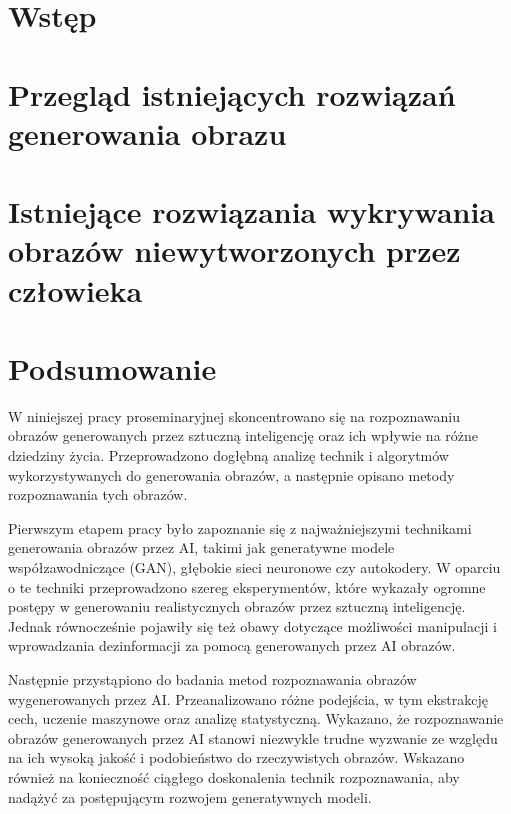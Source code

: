 \documentclass[11pt,a4paper,twoside,openright]{bookest}
\author{Patryk Lisik}
\begin{document}
    
    \delimitershortfall=-1pt

    \tableofcontents



    \chapter{Wstęp}\label{ch:wstep}
    

    \chapter{Przegląd istniejących rozwiązań generowania obrazu}\label{ch:przeglad-istniejacych-rozwiazan-generowania-obrazu}
    

    \chapter{Istniejące rozwiązania wykrywania obrazów niewytworzonych przez człowieka}\label{ch:istniejace-rozwiazania-wykrywania-obrazow-niewytworzonych-przez-czowieka}
    

    \chapter{Podsumowanie}\label{ch:podsumowanie}

    W niniejszej pracy proseminaryjnej skoncentrowano się na rozpoznawaniu obrazów generowanych przez sztuczną inteligencję oraz ich wpływie na różne dziedziny życia.
    Przeprowadzono dogłębną analizę technik i algorytmów wykorzystywanych do generowania obrazów, a następnie opisano metody rozpoznawania tych obrazów.

    Pierwszym etapem pracy było zapoznanie się z najważniejszymi technikami generowania obrazów przez AI, takimi jak generatywne modele współzawodniczące (GAN), głębokie sieci neuronowe czy autokodery.
    W oparciu o te techniki przeprowadzono szereg eksperymentów, które wykazały ogromne postępy w generowaniu realistycznych obrazów przez sztuczną inteligencję.
    Jednak równocześnie pojawiły się też obawy dotyczące możliwości manipulacji i wprowadzania dezinformacji za pomocą generowanych przez AI obrazów.

    Następnie przystąpiono do badania metod rozpoznawania obrazów wygenerowanych przez AI. Przeanalizowano różne podejścia, w tym ekstrakcję cech, uczenie maszynowe oraz analizę statystyczną.
    Wykazano, że rozpoznawanie obrazów generowanych przez AI stanowi niezwykle trudne wyzwanie ze względu na ich wysoką jakość i podobieństwo do rzeczywistych obrazów.
    Wskazano również na konieczność ciągłego doskonalenia technik rozpoznawania, aby nadążyć za postępującym rozwojem generatywnych modeli.
\end{document}

